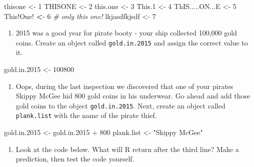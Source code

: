 \documentclass[]{book}
\newenvironment{Shaded}{\begin{snugshade}}{\end{snugshade}}
\newcommand{\DecValTok}[1]{\textcolor[rgb]{0.00,0.00,0.81}{{#1}}}
\newcommand{\FloatTok}[1]{\textcolor[rgb]{0.00,0.00,0.81}{{#1}}}
\newcommand{\StringTok}[1]{\textcolor[rgb]{0.31,0.60,0.02}{{#1}}}
\newcommand{\CommentTok}[1]{\textcolor[rgb]{0.56,0.35,0.01}{\textit{{#1}}}}
\newcommand{\ErrorTok}[1]{\textcolor[rgb]{0.64,0.00,0.00}{\textbf{{#1}}}}
\newcommand{\NormalTok}[1]{{#1}}
\providecommand{\tightlist}{%
  \setlength{\itemsep}{0pt}\setlength{\parskip}{0pt}}
\begin{document}
\begin{Shaded}
\begin{Highlighting}[]
\NormalTok{thisone <-}\StringTok{ }\DecValTok{1}
\NormalTok{THISONE <-}\StringTok{ }\DecValTok{2}
\NormalTok{this.one <-}\StringTok{ }\DecValTok{3}
\NormalTok{This}\FloatTok{.1} \NormalTok{<-}\StringTok{ }\DecValTok{4}
\NormalTok{ThIS.....ON...E <-}\StringTok{ }\DecValTok{5}
\NormalTok{This!One!}\StringTok{ }\ErrorTok{<}\NormalTok{-}\StringTok{ }\DecValTok{6}           \CommentTok{# only this one!}
\NormalTok{lkjasdfkjsdf <-}\StringTok{ }\DecValTok{7}
\end{Highlighting}
\end{Shaded}

\begin{enumerate}
\def\labelenumi{\arabic{enumi}.}
\setcounter{enumi}{2}
\tightlist
\item
  2015 was a good year for pirate booty - your ship collected 100,000
  gold coins. Create an object called \texttt{gold.in.2015} and assign
  the correct value to it.
\end{enumerate}

\begin{Shaded}
\begin{Highlighting}[]
\NormalTok{gold.in}\FloatTok{.2015} \NormalTok{<-}\StringTok{ }\DecValTok{100800}
\end{Highlighting}
\end{Shaded}

\begin{enumerate}
\def\labelenumi{\arabic{enumi}.}
\setcounter{enumi}{3}
\tightlist
\item
  Oops, during the last inspection we discovered that one of your
  pirates Skippy McGee hid 800 gold coins in his underwear. Go ahead and
  add those gold coins to the object \texttt{gold.in.2015}. Next, create
  an object called \texttt{plank.list} with the name of the pirate
  thief.
\end{enumerate}

\begin{Shaded}
\begin{Highlighting}[]
\NormalTok{gold.in}\FloatTok{.2015} \NormalTok{<-}\StringTok{ }\NormalTok{gold.in}\FloatTok{.2015} \NormalTok{+}\StringTok{ }\DecValTok{800}
\NormalTok{plank.list <-}\StringTok{ "Skippy McGee"}
\end{Highlighting}
\end{Shaded}

\begin{enumerate}
\def\labelenumi{\arabic{enumi}.}
\setcounter{enumi}{4}
\tightlist
\item
  Look at the code below. What will R return after the third line? Make
  a prediction, then test the code yourself.
\end{enumerate}
\end{document}
